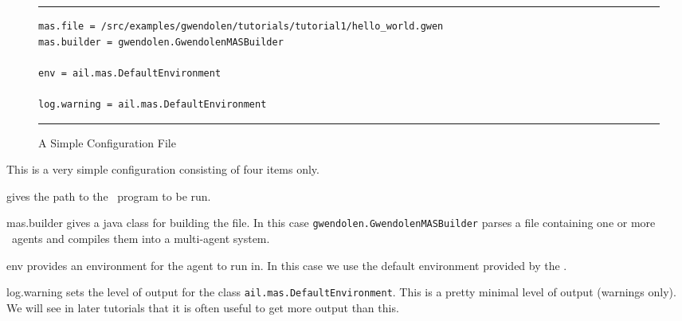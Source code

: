 \begin{figure}[htb]
\noindent\rule{\textwidth}{1pt}
\begin{verbatim}
mas.file = /src/examples/gwendolen/tutorials/tutorial1/hello_world.gwen
mas.builder = gwendolen.GwendolenMASBuilder

env = ail.mas.DefaultEnvironment

log.warning = ail.mas.DefaultEnvironment
\end{verbatim}
\rule{\textwidth}{1pt}
\caption{A Simple Configuration File}
\label{fig:gwen_config}
\end{figure}

This is a very simple configuration consisting of four items only.
\begin{description}
\item[mas.file] gives the path to the \gwendolen\ program to be run.
\begin{sloppypar}
\item[mas.builder] gives a java class for building the file.  In this case \texttt{gwendolen.GwendolenMASBuilder} parses a file containing one or more \gwendolen\ agents and compiles them into a multi-agent system.
\item[env] provides an environment for the agent to run in.  In this case we use the default environment provided by the \ail.
\item[log.warning] sets the level of output for the class \texttt{ail.mas.DefaultEnvironment}.  This is a pretty minimal level of output (warnings only).  We will see in later tutorials that it is often useful to get more output than this.
\end{sloppypar}
\end{description}

